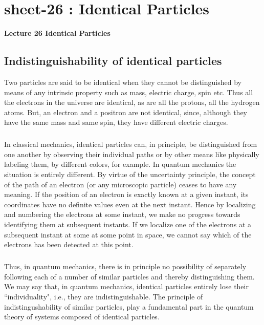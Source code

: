 \chapter{sheet-26 : Identical Particles}

\ifpdf
\graphicspath{{Chapter26/figs/}}
\else
\graphicspath{{Chapter26/figs/}}
\fi





\begin{Large}
	\noindent
	{\bf Lecture 26 \newline
		Identical Particles}
\end{Large}
\vspace{1 cm}

\section{Indistinguishability of identical particles}
Two particles are said to be identical when they cannot be distinguished by means of any intrinsic property such as mass, electric
charge, spin etc. Thus all the electrons in the universe are identical, as are all the protons, all the hydrogen atoms. But,
an electron and a positron are not identical, since, although they have the same mass and same spin, they have different
electric charges.

\paragraph{}
In classical mechanics, identical particles can, in principle, be distinguished from one another by observing their individual paths or by 
other means like physically labeling them, by different colors, for example. In quantum mechanics the situation is entirely different. By
virtue of the uncertainty principle, the concept of the path of an electron (or any microscopic particle) ceases to have any
meaning. If the position of an electron is exactly known at a given instant, its coordinates have no definite values even at the
next instant. Hence by localizing and numbering the electrons at some instant, we make no progress towards identifying them at subsequent instants. If we localize one of the electrons at a subsequent instant at some at some point in space, we cannot say which of the electrons has been detected at this point.

\paragraph{}
Thus, in quantum mechanics, there is in principle no possibility of separately following each of a number of similar particles and thereby distinguishing them. We may say that, in quantum mechanics, identical particles entirely lose their ``individuality", i.e., they are
indistinguishable. The principle of indistingushability of similar particles, play a fundamental part in the quantum theory of systems composed of identical particles.  

